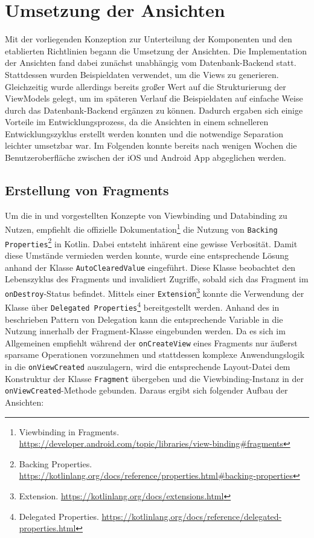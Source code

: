 \newpage

\section{Umsetzung der Ansichten}\label{sec:view-implementation}

Mit der vorliegenden Konzeption zur Unterteilung der Komponenten und den etablierten Richtlinien begann die Umsetzung der Ansichten. Die Implementation der Ansichten fand dabei zunächst unabhängig vom Datenbank-Backend statt. Stattdessen wurden Beispieldaten verwendet, um die Views zu generieren. Gleichzeitig wurde allerdings bereits großer Wert auf die Strukturierung der ViewModels gelegt, um im späteren Verlauf die Beispieldaten auf einfache Weise durch das Datenbank-Backend ergänzen zu können. Dadurch ergaben sich einige Vorteile im Entwicklungsprozess, da die Ansichten in einem schnelleren Entwicklungszyklus erstellt werden konnten und die notwendige Separation leichter umsetzbar war. Im Folgenden konnte bereits nach wenigen Wochen die Benutzeroberfläche zwischen der iOS und Android App abgeglichen werden.

\subsection{Erstellung von Fragments}\label{subsec:fragments}

Um die in  und  vorgestellten Konzepte von Viewbinding und Databinding zu Nutzen, empfiehlt die offizielle Dokumentation\footnote{Viewbinding in Fragments. \url{https://developer.android.com/topic/libraries/view-binding\#fragments}} die Nutzung von \texttt{Backing Properties}\footnote{Backing Properties. \url{https://kotlinlang.org/docs/reference/properties.html\#backing-properties}} in Kotlin. Dabei entsteht inhärent eine gewisse Verbosität. Damit diese Umstände vermieden werden konnte, wurde eine entsprechende Lösung anhand der Klasse \texttt{AutoClearedValue} eingeführt. Diese Klasse beobachtet den Lebenszyklus des Fragments und invalidiert Zugriffe, sobald sich das Fragment im \texttt{onDestroy}-Status befindet. Mittels einer \texttt{Extension}\footnote{Extension. \url{https://kotlinlang.org/docs/extensions.html}} konnte die Verwendung der Klasse über \texttt{Delegated Properties}\footnote{Delegated Properties. \url{https://kotlinlang.org/docs/reference/delegated-properties.html}} bereitgestellt werden. Anhand des in  beschrieben Pattern von Delegation kann die entsprechende Variable in die Nutzung innerhalb der Fragment-Klasse eingebunden werden. Da es sich im Allgemeinen empfiehlt während der \texttt{onCreateView} eines Fragments nur äußerst sparsame Operationen vorzunehmen und stattdessen komplexe Anwendungslogik in die \texttt{onViewCreated} auszulagern, wird die entsprechende Layout-Datei dem Konstruktur der Klasse \texttt{Fragment} übergeben und die Viewbinding-Instanz in der \texttt{onViewCreated}-Methode gebunden. Daraus ergibt sich folgender Aufbau der Ansichten:

